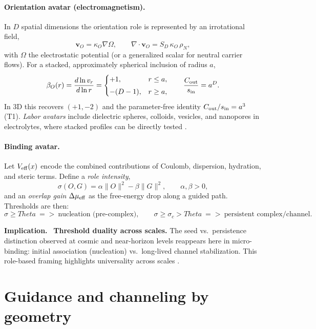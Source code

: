 \documentclass[12pt,a4paper,oneside]{scrreprt}
\def\Theta{Theta}%
\def\Rightarrow{=>}%
\newenvironment{implication}{\par\vspace{0.5em}\noindent\textbf{Implication.}\ }{\par\vspace{0.5em}}
\begin{document}
\paragraph{Orientation avatar (electromagnetism).} 
In $D$ spatial dimensions the orientation role is represented by 
an irrotational field,
\[
\mathbf v_O = \kappa_O \nabla \Omega, \qquad 
\nabla \!\cdot \mathbf v_O = S_D \, \kappa_O \, \rho_N,
\]
with $\Omega$ the electrostatic potential (or a generalized scalar for 
neutral carrier flows). 
For a stacked, approximately spherical inclusion of radius $a$,
\begin{equation}
\beta_O(r) = \frac{d \ln v_r}{d \ln r} = 
\begin{cases}
+1, & r \leq a, \\[0.3em]
-(D-1), & r \geq a,
\end{cases}
\qquad 
\frac{C_{\rm out}}{s_{\rm in}} = a^D.
\end{equation}
In 3D this recovers $(+1,-2)$ and the parameter-free identity 
$C_{\rm out}/s_{\rm in} = a^3$ (T1). 
\emph{Labor avatars} include dielectric spheres, colloids, vesicles, 
and nanopores in electrolytes, where stacked profiles can be 
directly tested \citep{Hunter2001ColloidSci,Israelachvili2011Intermolecular}. 

\paragraph{Binding avatar.} 
Let $V_{\rm eff}(x)$ encode the combined contributions of 
Coulomb, dispersion, hydration, and steric terms. 
Define a \emph{role intensity},
\[
\sigma(O,G) = \alpha \|O\|^2 - \beta \|G\|^2, \qquad \alpha,\beta>0,
\]
and an \emph{overlap gain} $\Delta \mu_{\rm eff}$ as the free-energy 
drop along a guided path. 
Thresholds are then:
\[
\sigma \geq \Theta \ \Rightarrow\ \text{nucleation (pre-complex)}, 
\qquad 
\sigma \geq \sigma_c > \Theta \ \Rightarrow\ \text{persistent complex/channel}.
\]

\begin{implication}
\textbf{Threshold duality across scales.} 
The seed vs.\ persistence distinction observed at cosmic and near-horizon 
levels reappears here in micro-binding: 
initial association (nucleation) vs.\ long-lived channel stabilization. 
This role-based framing highlights universality across scales 
\citep{Whitesides2002SelfAssembly,Sherrill2010Noncovalent}.
\end{implication}


\section{Guidance and channeling by geometry}\label{sec:micro-channeling}
\end{document}
